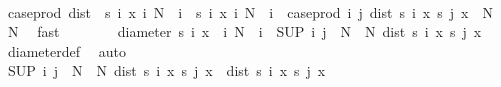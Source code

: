 \begin{isabellebody}
\ \ \ \ \ \ \isamarkupfalse%
\ {\isachardoublequoteopen}case{\isacharunderscore}{\kern0pt}prod\ dist\ {\isacharbackquote}{\kern0pt}\ {\isacharparenleft}{\kern0pt}{\isacharbraceleft}{\kern0pt}s\ i\ x\ {\isacharbar}{\kern0pt}i{\isachardot}{\kern0pt}\ N\ {\isasymle}\ i{\isacharbraceright}{\kern0pt}\ {\isasymtimes}\ {\isacharbraceleft}{\kern0pt}s\ i\ x\ {\isacharbar}{\kern0pt}i{\isachardot}{\kern0pt}\ N\ {\isasymle}\ i{\isacharbraceright}{\kern0pt}{\isacharparenright}{\kern0pt}\ {\isacharequal}{\kern0pt}\ case{\isacharunderscore}{\kern0pt}prod\ {\isacharparenleft}{\kern0pt}{\isasymlambda}i\ j{\isachardot}{\kern0pt}\ dist\ {\isacharparenleft}{\kern0pt}s\ i\ x{\isacharparenright}{\kern0pt}\ {\isacharparenleft}{\kern0pt}s\ j\ x{\isacharparenright}{\kern0pt}{\isacharparenright}{\kern0pt}\ {\isacharbackquote}{\kern0pt}\ {\isacharparenleft}{\kern0pt}{\isacharbraceleft}{\kern0pt}N{\isachardot}{\kern0pt}{\isachardot}{\kern0pt}{\isacharbraceright}{\kern0pt}\ {\isasymtimes}\ {\isacharbraceleft}{\kern0pt}N{\isachardot}{\kern0pt}{\isachardot}{\kern0pt}{\isacharbraceright}{\kern0pt}{\isacharparenright}{\kern0pt}{\isachardoublequoteclose}\ \isamarkupfalse%
\ fast\isanewline
\ \ \ \ \ \ \isamarkupfalse%
\ {\isachardoublequoteopen}diameter\ {\isacharbraceleft}{\kern0pt}s\ i\ x\ {\isacharbar}{\kern0pt}\ i{\isachardot}{\kern0pt}\ N\ {\isasymle}\ i{\isacharbraceright}{\kern0pt}\ {\isacharequal}{\kern0pt}\ {\isacharparenleft}{\kern0pt}SUP\ {\isacharparenleft}{\kern0pt}i{\isacharcomma}{\kern0pt}\ j{\isacharparenright}{\kern0pt}\ {\isasymin}\ {\isacharbraceleft}{\kern0pt}N{\isachardot}{\kern0pt}{\isachardot}{\kern0pt}{\isacharbraceright}{\kern0pt}\ {\isasymtimes}\ {\isacharbraceleft}{\kern0pt}N{\isachardot}{\kern0pt}{\isachardot}{\kern0pt}{\isacharbraceright}{\kern0pt}{\isachardot}{\kern0pt}\ dist\ {\isacharparenleft}{\kern0pt}s\ i\ x{\isacharparenright}{\kern0pt}\ {\isacharparenleft}{\kern0pt}s\ j\ x{\isacharparenright}{\kern0pt}{\isacharparenright}{\kern0pt}{\isachardoublequoteclose}\ \isamarkupfalse%
\ diameter{\isacharunderscore}{\kern0pt}def\ \isamarkupfalse%
\ auto\isanewline
\ \ \ \ \ \ \isamarkupfalse%
\ \isamarkupfalse%
\ {\isachardoublequoteopen}{\isacharparenleft}{\kern0pt}SUP\ {\isacharparenleft}{\kern0pt}i{\isacharcomma}{\kern0pt}\ j{\isacharparenright}{\kern0pt}\ {\isasymin}\ {\isacharbraceleft}{\kern0pt}N{\isachardot}{\kern0pt}{\isachardot}{\kern0pt}{\isacharbraceright}{\kern0pt}\ {\isasymtimes}\ {\isacharbraceleft}{\kern0pt}N{\isachardot}{\kern0pt}{\isachardot}{\kern0pt}{\isacharbraceright}{\kern0pt}{\isachardot}{\kern0pt}\ dist\ {\isacharparenleft}{\kern0pt}s\ i\ x{\isacharparenright}{\kern0pt}\ {\isacharparenleft}{\kern0pt}s\ j\ x{\isacharparenright}{\kern0pt}{\isacharparenright}{\kern0pt}\ {\isasymge}\ dist\ {\isacharparenleft}{\kern0pt}s\ i\ x{\isacharparenright}{\kern0pt}\ {\isacharparenleft}{\kern0pt}s\ j\ x{\isacharparenright}{\kern0pt}{\isachardoublequoteclose}\ \isamarkupfalse%

\end{isabellebody}

